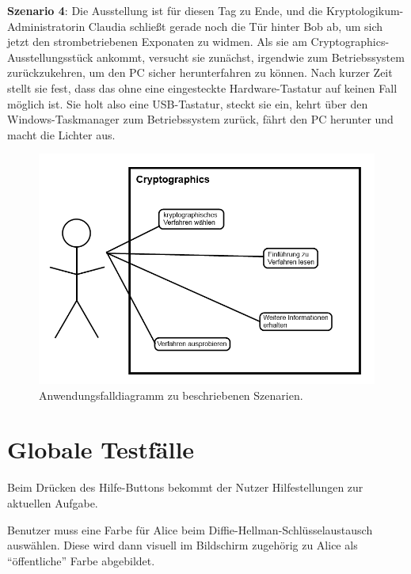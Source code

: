 \documentclass{article}
\begin{document}
\textbf{Szenario 4}:
Die Ausstellung ist für diesen Tag zu Ende, und die Kryptologikum-Administratorin Claudia schließt gerade noch die Tür hinter Bob ab, um sich jetzt den strombetriebenen Exponaten zu widmen. Als sie am \gls{Cryptographics}-Ausstellungsstück ankommt, versucht sie zunächst, irgendwie zum Betriebssystem zurückzukehren, um den PC sicher herunterfahren zu können. Nach kurzer Zeit stellt sie fest, dass das ohne eine eingesteckte Hardware-Tastatur auf keinen Fall möglich ist. Sie holt also eine USB-Tastatur, steckt sie ein, kehrt über den Windows-Taskmanager zum Betriebssystem zurück, fährt den PC herunter und macht die Lichter aus.\\

\begin{figure}[h!]
  \centering
    \includegraphics[width=\textwidth]{resources/usecase1}
  \caption{Anwendungsfalldiagramm zu beschriebenen Szenarien.}
\end{figure}

\section{Globale Testfälle}
\begin{T}[start = 10]
\item Beim Drücken des Hilfe-Buttons bekommt der Nutzer Hilfestellungen zur aktuellen Aufgabe.
\end{T}

\begin{T}[start = 20]
 \item Benutzer muss eine Farbe für Alice beim Diffie-Hellman-Schlüsselaustausch auswählen. Diese wird dann visuell im Bildschirm zugehörig zu Alice als ``öffentliche'' Farbe abgebildet.
\end{T}
\end{document}
